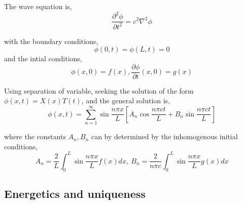 \documentclass{article}
\theoremstyle{definition}
\begin{document}
The wave equation is,
\begin{equation}
\frac{\partial^2 \phi}{\partial t^2}=c^2 \nabla ^2 \phi
\end{equation}

with the boundary conditions,
\begin{equation}
\phi(0,t)=\phi(L,t)=0
\end{equation}
and the intial conditions,
\begin{equation}
\phi(x,0)=f(x),\frac{\partial \phi}{\partial t}(x,0)=g(x)
\end{equation}


Using separation of variable, seeking the solution of the form $\phi(x,t)=X(x)T(t)$, and the general solution is,
\begin{equation}
\phi(x,t)=\sum_{n=1}^{\infty} \sin \frac{n \pi x}{L}\left[A_n\cos\frac{n\pi ct}{L}+B_n \sin \frac{n\pi ct}{L}\right]
\end{equation}

where the constants $A_n,B_n$ can by determined by the inhomogenous initial conditions,
\begin{equation}
A_n=\frac{2}{L}\int_0^L \sin \frac{n \pi x}{L} f(x) dx, \ B_n=\frac{2}{n \pi c}\int_0^L \sin \frac{n \pi x}{L} g(x) dx
\end{equation}

\subsection{Energetics and uniqueness}
\end{document}

